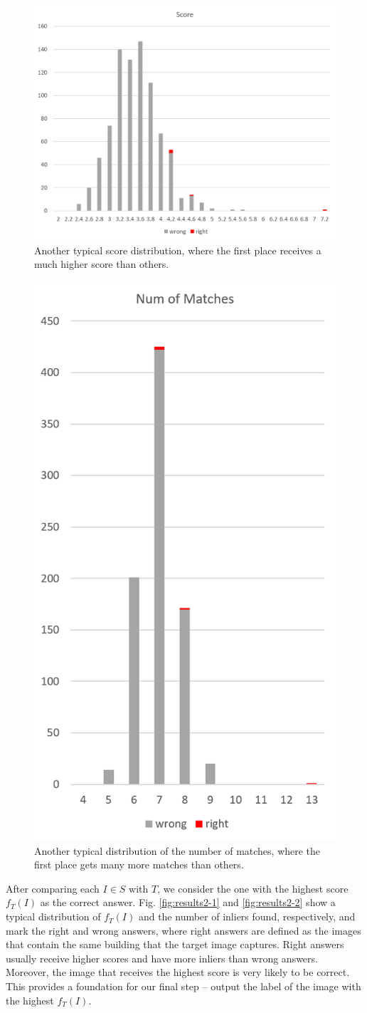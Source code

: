 \documentclass[10pt,twocolumn,letterpaper]{article}
\begin{document}
\begin{figure}
  \centering
  \includegraphics[width=0.65\linewidth]{fig/7.png}
   \caption{Another typical score distribution, where the first place receives a much higher score than others.}
   \label{fig:results2-3}
\end{figure}

\begin{figure}
  \centering
  \includegraphics[width=0.3\linewidth]{fig/8.png}
   \caption{Another typical distribution of the number of matches, where the first place gets many more matches than others.}
   \label{fig:results2-4}
\end{figure}

After comparing each $I\in S$ with $T$, we consider the one with the highest score $f_T(I)$ as the correct answer. Fig. \ref{fig:results2-1} and \ref{fig:results2-2} show a typical distribution of $f_T(I)$ and the number of inliers found, respectively, and mark the right and wrong answers, where right answers are defined as the images that contain the same building that the target image captures. Right answers usually receive higher scores and have more inliers than wrong answers. Moreover, the image that receives the highest score is very likely to be correct. This provides a foundation for our final step -- output the label of the image with the highest $f_T(I)$. 
\end{document}
